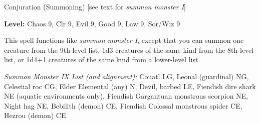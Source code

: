 
Conjuration (Summoning) [see text for \textit{summon monster I}]

\textbf{Level:} Chaos 9, Clr 9, Evil 9, Good 9, Law 9, Sor/Wiz 9

This spell functions like \textit{summon monster I}, except that you can summon 
one creature from the 9th-level list, 1d3 creatures of the same kind from the 8th-level 
list, or 1d4+1 creatures of the same kind from a lower-level list.

\textit{Summon Monster IX List (and alignment):} Couatl LG, Leonal (guardinal) NG, Celestial roc CG, Elder Elemental (any) N, Devil, barbed LE, Fiendish dire shark NE (aquatic environments only), Fiendish Gargantuan monstrous scorpion NE, Night hag NE, Bebilith (demon) CE, Fiendish Colossal monstrous spider CE, Hezrou (demon) CE
